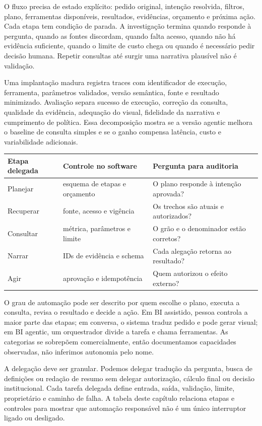 O fluxo precisa de estado explícito: pedido original, intenção resolvida, filtros, plano, ferramentas disponíveis, resultados, evidências, orçamento e próxima ação. Cada etapa tem condição de parada. A investigação termina quando responde à pergunta, quando as fontes discordam, quando falta acesso, quando não há evidência suficiente, quando o limite de custo chega ou quando é necessário pedir decisão humana. Repetir consultas até surgir uma narrativa plausível não é validação.

Uma implantação madura registra traces com identificador de execução, ferramenta, parâmetros validados, versão semântica, fonte e resultado minimizado. Avaliação separa sucesso de execução, correção da consulta, qualidade da evidência, adequação do visual, fidelidade da narrativa e cumprimento de política. Essa decomposição mostra se a versão agentic melhora o baseline de consulta simples e se o ganho compensa latência, custo e variabilidade adicionais.

\begin{center}
\small
\begin{tabularx}{\textwidth}{p{2.6cm}Y Y}
\toprule
Etapa delegada & Controle no software & Pergunta para auditoria \\
\midrule
Planejar & esquema de etapas e orçamento & O plano responde à intenção aprovada? \\
Recuperar & fonte, acesso e vigência & Os trechos são atuais e autorizados? \\
Consultar & métrica, parâmetros e limite & O grão e o denominador estão corretos? \\
Narrar & IDs de evidência e schema & Cada alegação retorna ao resultado? \\
Agir & aprovação e idempotência & Quem autorizou o efeito externo? \\
\bottomrule
\end{tabularx}
\end{center}

O grau de automação pode ser descrito por quem escolhe o plano, executa a consulta, revisa o resultado e decide a ação. Em BI assistido, pessoa controla a maior parte das etapas; em conversa, o sistema traduz pedido e pode gerar visual; em BI agentic, um orquestrador divide a tarefa e chama ferramentas. As categorias se sobrepõem comercialmente, então documentamos capacidades observadas, não inferimos autonomia pelo nome.

A delegação deve ser granular. Podemos delegar tradução da pergunta, busca de definições ou redação de resumo sem delegar autorização, cálculo final ou decisão institucional. Cada tarefa delegada define entrada, saída, validação, limite, proprietário e caminho de falha. A tabela deste capítulo relaciona etapas e controles para mostrar que automação responsável não é um único interruptor ligado ou desligado.

